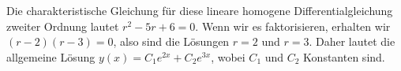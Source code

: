 Die charakteristische Gleichung für diese lineare homogene Differentialgleichung zweiter Ordnung lautet $r^2 - 5r + 6 = 0$.
Wenn wir es faktorisieren, erhalten wir $(r - 2)(r - 3) = 0$, also sind die Lösungen $r = 2$ und $r = 3$.
Daher lautet die allgemeine Lösung $y(x) = C_1e^{2x} + C_2e^{3x}$, wobei $C_1$ und $C_2$ Konstanten sind.
